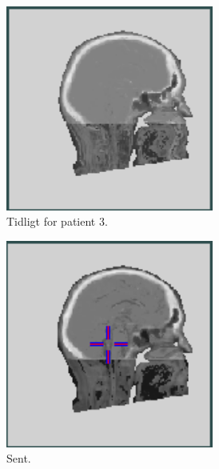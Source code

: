 \begin{figure}[H]
\begin{subfigure}{0.3\textwidth}
        \centering
        \includegraphics[width=0.75\textwidth]{colager/over_tid_sct/over_tid_sct_210445_early.png}
        \caption{Tidligt for patient 3.}
        \label{col:over_time_sct_pat3_early}
    \end{subfigure}\hfill
    \begin{subfigure}{0.3\textwidth}
        \centering
        \includegraphics[width=0.75\textwidth]{colager/over_tid_sct/over_tid_sct_210445_late.png}
        \caption{Sent.}
        \label{col:over_time_sct_pat3_late}
    \end{subfigure}\hfill
    \begin{subfigure}{0.3\textwidth}
        \centering

\end{subfigure}
\end{figure}

